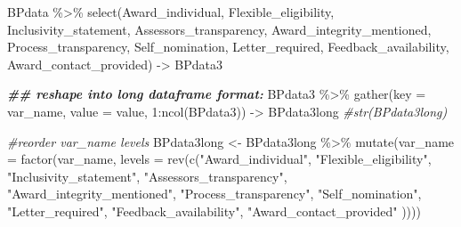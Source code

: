 \documentclass[
]{article}
\newenvironment{Shaded}{\begin{snugshade}}{\end{snugshade}}
\newcommand{\AttributeTok}[1]{\textcolor[rgb]{0.77,0.63,0.00}{#1}}
\newcommand{\CommentTok}[1]{\textcolor[rgb]{0.56,0.35,0.01}{\textit{#1}}}
\newcommand{\DecValTok}[1]{\textcolor[rgb]{0.00,0.00,0.81}{#1}}
\newcommand{\DocumentationTok}[1]{\textcolor[rgb]{0.56,0.35,0.01}{\textbf{\textit{#1}}}}
\newcommand{\FunctionTok}[1]{\textcolor[rgb]{0.00,0.00,0.00}{#1}}
\newcommand{\NormalTok}[1]{#1}
\newcommand{\OtherTok}[1]{\textcolor[rgb]{0.56,0.35,0.01}{#1}}
\newcommand{\SpecialCharTok}[1]{\textcolor[rgb]{0.00,0.00,0.00}{#1}}
\newcommand{\StringTok}[1]{\textcolor[rgb]{0.31,0.60,0.02}{#1}}
\begin{document}
\begin{Shaded}
\begin{Highlighting}[]
\NormalTok{BPdata }\SpecialCharTok{\%\textgreater{}\%} \FunctionTok{select}\NormalTok{(Award\_individual, Flexible\_eligibility, Inclusivity\_statement, Assessors\_transparency, Award\_integrity\_mentioned, Process\_transparency, Self\_nomination, Letter\_required, Feedback\_availability, Award\_contact\_provided) }\OtherTok{{-}\textgreater{}}\NormalTok{ BPdata3}

\DocumentationTok{\#\# reshape into long dataframe format:}
\NormalTok{BPdata3 }\SpecialCharTok{\%\textgreater{}\%} \FunctionTok{gather}\NormalTok{(}\AttributeTok{key =}\NormalTok{ var\_name, }\AttributeTok{value =}\NormalTok{ value, }\DecValTok{1}\SpecialCharTok{:}\FunctionTok{ncol}\NormalTok{(BPdata3)) }\OtherTok{{-}\textgreater{}}\NormalTok{ BPdata3long}
\CommentTok{\#str(BPdata3long)}

\CommentTok{\#reorder var\_name levels}
\NormalTok{BPdata3long }\OtherTok{\textless{}{-}}\NormalTok{ BPdata3long }\SpecialCharTok{\%\textgreater{}\%} \FunctionTok{mutate}\NormalTok{(}\AttributeTok{var\_name =} \FunctionTok{factor}\NormalTok{(var\_name, }\AttributeTok{levels =} \FunctionTok{rev}\NormalTok{(}\FunctionTok{c}\NormalTok{(}\StringTok{"Award\_individual"}\NormalTok{,}
                                                                            \StringTok{"Flexible\_eligibility"}\NormalTok{, }
                                                                            \StringTok{"Inclusivity\_statement"}\NormalTok{, }
                                                                            \StringTok{"Assessors\_transparency"}\NormalTok{, }
                                                                            \StringTok{"Award\_integrity\_mentioned"}\NormalTok{, }
                                                                            \StringTok{"Process\_transparency"}\NormalTok{,}
                                                                            \StringTok{"Self\_nomination"}\NormalTok{, }
                                                                            \StringTok{"Letter\_required"}\NormalTok{, }
                                                                            \StringTok{"Feedback\_availability"}\NormalTok{, }
                                                                            \StringTok{"Award\_contact\_provided"} 
\NormalTok{                                                                            ))))}



\end{Highlighting}
\end{Shaded}
\end{document}
